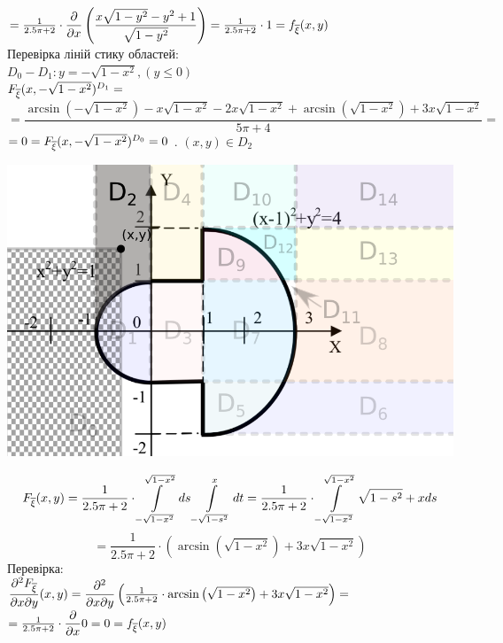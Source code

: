 \documentclass[14pt,a4paper]{scrartcl}
\theoremstyle{definition}
\theoremstyle{remark}
\theoremstyle{definition}
\theoremstyle{definition}
\begin{document}
$ = \frac{1}{2.5\pi + 2} \cdot \dfrac{\partial}{\partial x} \left( \dfrac{x\sqrt{1-y^2}-y^2+1}{\sqrt{1-y^2}} \right) =\frac{1}{2.5\pi + 2} \cdot 1  =f_{\overline{\xi}} (x,y)$\\
Перевірка ліній стику областей:\\
$D_0 - D_1: y = -\sqrt{1- x^2}, (y \leq 0)$\\
$ F_{\overline{\xi}} (x,-\sqrt{1- x^2})^{D_1} = $\\
$=\dfrac{\arcsin\left(-\sqrt{1-x^2}\right)-x\sqrt{1-x^2}-2x\sqrt{1-x^2}+\arcsin\left(\sqrt{1-x^2}\right)+3x\sqrt{1-x^2}}{5\pi + 4} =$
\\$= 0= F_{\overline{\xi}} (x,-\sqrt{1- x^2})^{D_0} = 0$
. $(x,y) \in D_2$
\begin{center} \includegraphics[scale=0.4]{assets/zone32.png} \end{center}
$$
F_{\overline{\xi}} (x,y) =  \frac{1}{2.5\pi + 2} \cdot  \int\limits_{-\sqrt{1- x^2}}^{\sqrt{1- x^2}}{ds  \int\limits_{-\sqrt{1-s^2}}^{x}{dt}} =
\frac{1}{2.5\pi + 2} \cdot  \int\limits_{-\sqrt{1- x^2}}^{\sqrt{1- x^2}}{\sqrt{1-s^2}+xds  }
$$
$$
= \frac{1}{2.5\pi + 2} \cdot \left( \arcsin\left(\sqrt{1-x^2}\right)+3x\sqrt{1-x^2} \right)
$$
Перевірка:\\
$\dfrac{\partial^2 F_{\overline{\xi}}}{\partial x \partial y}(x,y) = \dfrac{\partial^2}{\partial x \partial y} \left( \frac{1}{2.5\pi + 2} \cdot\arcsin\left(\sqrt{1-x^2}\right)+3x\sqrt{1-x^2} \right) =$\\
$ = \frac{1}{2.5\pi + 2} \cdot \dfrac{\partial}{\partial x} 0 = 0 =f_{\overline{\xi}} (x,y)$\\
\end{document}
